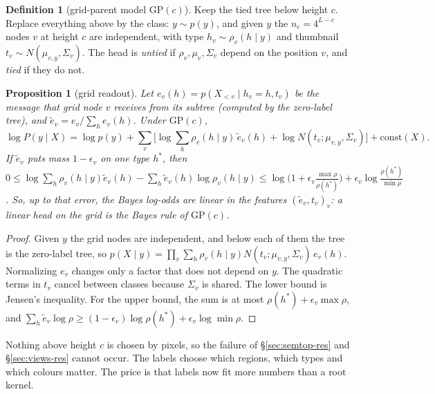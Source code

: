 \documentclass[11pt]{article}
\newtheorem{proposition}[theorem]{Proposition}
\theoremstyle{definition}
\newtheorem{definition}[theorem]{Definition}
\begin{document}
\begin{definition}[grid-parent model $\mathrm{GP}(c)$]\label{def:gp}
Keep the tied tree below height $c$. Replace everything above by the class: $y\sim p(y)$, and given $y$ the $n_c=4^{L-c}$
nodes $v$ at height $c$ are independent, with type $h_v\sim\rho_v(h\mid y)$ and thumbnail $t_v\sim N(\mu_{v,y},\Sigma_v)$.
The head is \emph{untied} if $\rho_v,\mu_v,\Sigma_v$ depend on the position $v$, and \emph{tied} if they do not.
\end{definition}

\begin{proposition}[grid readout]\label{prop:gridread}
Let $e_v(h)=p(X_{<v}\mid h_v=h,t_v)$ be the message that grid node $v$ receives from its subtree (computed by the
zero-label tree), and $\tilde e_v=e_v/\sum_he_v(h)$. Under $\mathrm{GP}(c)$,
\[
\log P(y\mid X)=\log p(y)+\sum_v\Big[\log\sum_h\rho_v(h\mid y)\,\tilde e_v(h)+\log N(t_v;\mu_{v,y},\Sigma_v)\Big]+\mathrm{const}(X).
\]
If $\tilde e_v$ puts mass $1-\epsilon_v$ on one type $h^*$, then
$0\le\log\sum_h\rho_v(h\mid y)\tilde e_v(h)-\sum_h\tilde e_v(h)\log\rho_v(h\mid y)\le\log\big(1+\epsilon_v\tfrac{\max\rho}{\rho(h^*)}\big)
+\epsilon_v\log\tfrac{\rho(h^*)}{\min\rho}$. So, up to that error, the Bayes log-odds are \emph{linear} in the features
$(\tilde e_v,t_v)_v$: a linear head on the grid is the Bayes rule of $\mathrm{GP}(c)$.
\end{proposition}
\begin{proof}
Given $y$ the grid nodes are independent, and below each of them the tree is the zero-label tree, so
$p(X\mid y)=\prod_v\sum_h\rho_v(h\mid y)N(t_v;\mu_{v,y},\Sigma_v)\,e_v(h)$. Normalizing $e_v$ changes only a factor
that does not depend on $y$. The quadratic terms in $t_v$ cancel between classes because $\Sigma_v$ is shared. The lower
bound is Jensen's inequality. For the upper bound, the sum is at most $\rho(h^*)+\epsilon_v\max\rho$, and
$\sum_h\tilde e_v\log\rho\ge(1-\epsilon_v)\log\rho(h^*)+\epsilon_v\log\min\rho$.
\end{proof}

\noindent Nothing above height $c$ is chosen by pixels, so the failure of \S\ref{sec:semtop-res} and
\S\ref{sec:views-res} cannot occur. The labels choose which regions, which types and which colours matter. The price is that
labels now fit more numbers than a root kernel.
\end{document}
